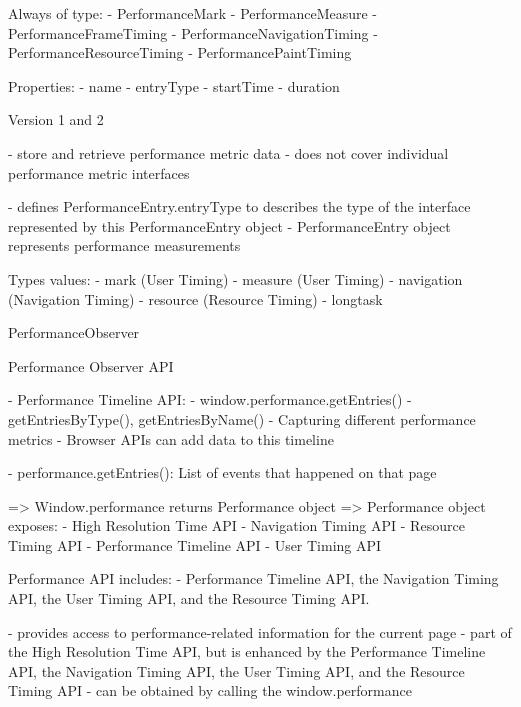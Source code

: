 Always of type:
- PerformanceMark
- PerformanceMeasure
- PerformanceFrameTiming
- PerformanceNavigationTiming
- PerformanceResourceTiming
- PerformancePaintTiming

Properties:
- name
- entryType
- startTime
- duration

	
	

Version 1 and 2

- store and retrieve performance metric data
- does not cover individual performance metric interfaces


- defines PerformanceEntry.entryType to describes the type of the interface represented by this PerformanceEntry object
- PerformanceEntry object represents performance measurements


Types values:
- mark (User Timing)
- measure (User Timing)
- navigation (Navigation Timing)
- resource (Resource Timing)
- longtask



PerformanceObserver

Performance Observer API %


- Performance Timeline API:
	- window.performance.getEntries()
	- getEntriesByType(), getEntriesByName()
	- Capturing different performance metrics
	- Browser APIs can add data to this timeline

	- performance.getEntries(): List of events that happened on that page
	
	

=> Window.performance returns Performance object
=> Performance object exposes:
	- High Resolution Time API
	- Navigation Timing API
	- Resource Timing API
	- Performance Timeline API
	- User Timing API
	

Performance API includes:
- Performance Timeline API, the Navigation Timing API, the User Timing API, and the Resource Timing API.


- provides access to performance-related information for the current page
- part of the High Resolution Time API, but is enhanced by the Performance Timeline API, the Navigation Timing API, the User Timing API, and the Resource Timing API
- can be obtained by calling the window.performance


